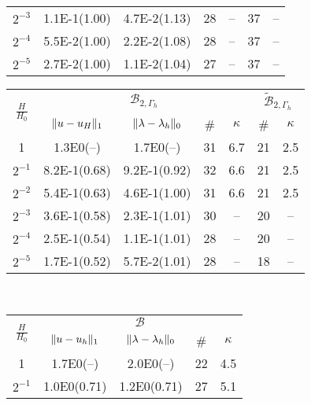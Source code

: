 \begin{table}
{\begin{minipage}{0.49\textwidth}
\begin{center}
\begin{tabular}{c|cccc||cc}
$2^{-3}$ & 1.1E-1(1.00) & 4.7E-2(1.13)& 28 & --   & 37 & --   \\
$2^{-4}$ & 5.5E-2(1.00) & 2.2E-2(1.08)& 28 & --   & 37 & --   \\
$2^{-5}$ & 2.7E-2(1.00) & 1.1E-2(1.04)& 27 & --   & 37 & --   \\
\hline
  \end{tabular}
  \end{center}
  \end{minipage}
  }
    \scriptsize{%
    \begin{minipage}{0.49\textwidth}
  \begin{center}
    \begin{tabular}{c|cccc||cc}
      \hline
      \multirow{2}{*}{$\frac{H}{H_0}$} & \multicolumn{4}{c||}{$\mathcal{B}_{2, \Gamma_h}$} & \multicolumn{2}{c}{$\tilde{\mathcal{B}}_{2, \Gamma_h}$}\\
      \cline{2-7}
      & $\lVert{u-u_H}\rVert_1$ & $\lVert{\lambda-\lambda_h}\rVert_0$ & \# & $\kappa$ & \# & $\kappa$\\
      \hline
1       & 1.3E0(--)   & 1.7E0(--)    & 31 & 6.7 & 21 & 2.5\\
$2^{-1}$ &8.2E-1(0.68) & 9.2E-1(0.92)  & 32 & 6.6 & 21 & 2.5\\
$2^{-2}$ &5.4E-1(0.63) & 4.6E-1(1.00)  & 31 & 6.6 & 21 & 2.5\\
$2^{-3}$ &3.6E-1(0.58) & 2.3E-1(1.01)  & 30 & --  & 20 & --  \\
$2^{-4}$ &2.5E-1(0.54) & 1.1E-1(1.01)  & 28 & --  & 20 & --  \\
$2^{-5}$ &1.7E-1(0.52) & 5.7E-2(1.01)  & 28 & --  & 18 & --  \\
      \hline
  \end{tabular}
  \end{center}
  \end{minipage}
    }
    \vspace{5pt}
    \\
  \scriptsize{%
    \begin{minipage}{0.49\textwidth}
  \begin{center}
    \begin{tabular}{c|cccc}
      \hline
      \multirow{2}{*}{$\frac{H}{H_0}$} & \multicolumn{4}{c}{$\mathcal{B}$}\\
      \cline{2-5}
      & $\lVert{u-u_h}\rVert_1$ & $\lVert{\lambda-\lambda_h}\rVert_0$ & \# & $\kappa$\\
      \hline
1       & 1.7E0(--)    & 2.0E0(--)    & 22 &4.5\\
$2^{-1}$ & 1.0E0(0.71)  & 1.2E0(0.71)  & 27 &5.1\\

\end{tabular}
\end{center}
\end{minipage}}
\end{table}
